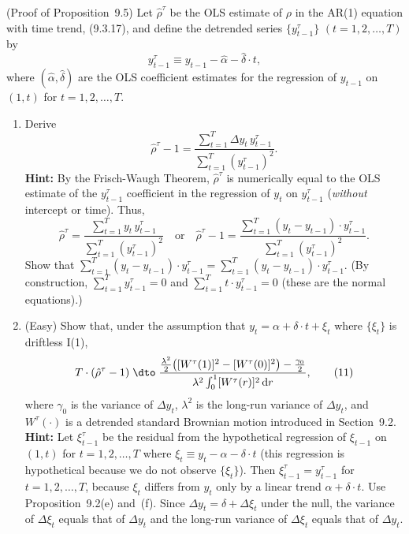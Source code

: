 \begin{problemset}
\exercise[3]
(Proof of Proposition~9.5) \enspace Let $\hat{\rho}^\tau$ be the OLS estimate of $\rho$ in the AR(1)
equation with time trend, (9.3.17), and define the detrended series $\{y_{t-1}^\tau\}$ $(t =
1, 2, \ldots, T)$ by
\[
y_{t-1}^\tau \equiv y_{t-1} - \hat{\alpha} - \hat{\delta} \cdot t,
\tag{8}
\]
where $(\hat{\alpha}, \hat{\delta})$ are the OLS coefficient estimates for the regression of $y_{t-1}$ on
$(1, t)$ for $t = 1, 2, \ldots, T$.

\begin{enumerate}[label=(\alph*)]
\item Derive
\[
\hat{\rho}^\tau - 1 = \frac{\sum_{t=1}^{T}\Delta y_t\, y_{t-1}^\tau}{\sum_{t=1}^{T}(y_{t-1}^\tau)^2}.
\tag{9}
\]
\textbf{Hint:} By the Frisch-Waugh Theorem, $\hat{\rho}^\tau$ is numerically equal to the OLS
estimate of the $y_{t-1}^\tau$ coefficient in the regression of $y_t$ on $y_{t-1}^\tau$ (\emph{without} intercept or time). Thus,
\[
\hat{\rho}^\tau = \frac{\sum_{t=1}^{T} y_t\, y_{t-1}^\tau}{\sum_{t=1}^{T}(y_{t-1}^\tau)^2}
\quad \text{or} \quad
\hat{\rho}^\tau - 1 = \frac{\sum_{t=1}^{T}(y_t - y_{t-1}) \cdot y_{t-1}^\tau}{\sum_{t=1}^{T}(y_{t-1}^\tau)^2}.
\tag{10}
\]
Show that $\sum_{t=1}^{T}(y_t - y_{t-1}) \cdot y_{t-1}^\tau = \sum_{t=1}^{T}(y_t - y_{t-1}) \cdot y_{t-1}^\tau$. (By construction,
$\sum_{t=1}^{T} y_{t-1}^\tau = 0$ and $\sum_{t=1}^{T} t \cdot y_{t-1}^\tau = 0$ (these are the normal equations).)

\item (Easy) \enspace Show that, under the assumption that $y_t = \alpha + \delta \cdot t + \xi_t$ where $\{\xi_t\}$
is driftless I(1),
\[
T \cdot (\hat{\rho}^\tau - 1) \;\dto\;
\frac{\frac{\lambda^2}{2}\big([W^\tau(1)]^2 - [W^\tau(0)]^2\big) - \frac{\gamma_0}{2}}{\lambda^2 \int_0^1 [W^\tau(r)]^2\,\mathrm{d}r},
\tag{11}
\]
where $\gamma_0$ is the variance of $\Delta y_t$, $\lambda^2$ is the long-run variance of $\Delta y_t$, and
$W^\tau(\cdot)$ is a detrended standard Brownian motion introduced in Section~9.2.
\textbf{Hint:} Let $\xi_{t-1}^\tau$ be the residual from the hypothetical regression of $\xi_{t-1}$ on
$(1, t)$ for $t = 1, 2, \ldots, T$ where $\xi_t \equiv y_t - \alpha - \delta \cdot t$ (this regression is
hypothetical because we do not observe $\{\xi_t\}$). Then $\xi_{t-1}^\tau = y_{t-1}^\tau$ for $t = 1,
2, \ldots, T$, because $\xi_t$ differs from $y_t$ only by a linear trend $\alpha + \delta \cdot t$. Use
Proposition~9.2(e) and~(f). Since $\Delta y_t = \delta + \Delta\xi_t$ under the null, the variance
of $\Delta\xi_t$ equals that of $\Delta y_t$ and the long-run variance of $\Delta\xi_t$ equals that of
$\Delta y_t$.


\end{enumerate}
\end{problemset}
